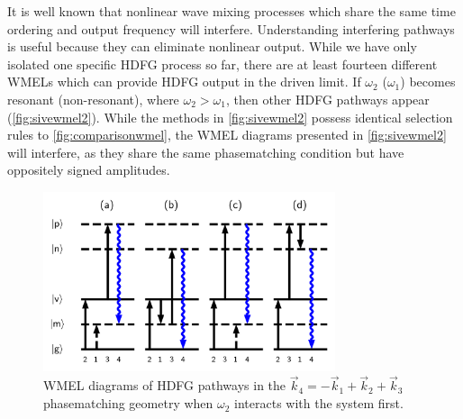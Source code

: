 \documentclass[aip, jcp, reprint, onecolumn]{revtex4-2}
\begin{document}
It is well known that nonlinear wave mixing processes which share the same time ordering and output frequency will interfere. \cite{RN342, RN135}
Understanding interfering pathways is useful because they can eliminate nonlinear output. 
While we have only isolated one specific HDFG process so far, there are at least fourteen different WMELs which can provide HDFG output in the driven limit. \cite{RN352}
If $\omega_2$ ($\omega_1$) becomes resonant (non-resonant), where $\omega_2 > \omega_1$, then other HDFG pathways appear (\autoref{fig:sivewmel2}).\cite{McDonnell2024} 
While the methods in \autoref{fig:sivewmel2} possess identical selection rules to \autoref{fig:comparisonwmel}, the WMEL diagrams presented in \autoref{fig:sivewmel2} will interfere, as they share the same phasematching condition but have oppositely signed amplitudes.
\begin{figure}[!htbp]
	\centering
	\includegraphics[width=3.375in]{figures/timeorderedwmel.png}
	\caption{WMEL diagrams of HDFG pathways in the  $\vec{k}_4 = -\vec{k}_1 + \vec{k}_2 + \vec{k}_3$ phasematching geometry when $\omega_2$ interacts with the system first. 
	}
	\label{fig:sivewmel2}
\end{figure}
\end{document}
